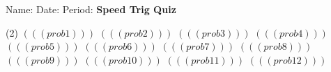 \documentclass{minimal}
\begin{document}
\noindent Name:\underline{\hspace{5cm}}\hspace{1.25cm}
Date:\underline{\hspace{3cm}}\hspace{1.25cm}
Period:\underline{\hspace{1cm}}
\vspace{15pt}
\newline\newline
{\fontsize{12pt}{12pt}\selectfont \textbf{Speed Trig Quiz}}
\newline\newline
{}
\begin{tasks}(2)
	\task $(((prob1)))$
	\task $(((prob2)))$
	\task $(((prob3)))$
	\task $(((prob4)))$
	\task $(((prob5)))$
	\task $(((prob6)))$
	\task $(((prob7)))$
	\task $(((prob8)))$
	\task $(((prob9)))$
	\task $(((prob10)))$
	\task $(((prob11)))$
	\task $(((prob12)))$
\end{tasks}
\end{document}
